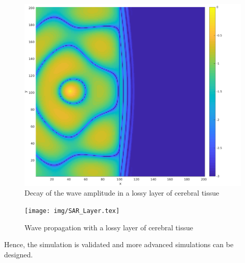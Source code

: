\begin{figure}[H]
\centering
    \includegraphics[width=.8\textwidth]{img/SAR_layer_im.pdf}
     \caption{Decay of the wave amplitude in a lossy layer of cerebral tissue}
     \label{fig:valid:SAR_Layer}
\end{figure}
\begin{figure}[H]
\centering
    \texttt{[image: img/SAR\_Layer.tex]}
     \caption{Wave propagation with a lossy layer of cerebral tissue}
     \label{fig:valid:SAR_Layer_x}
\end{figure}

Hence, the simulation is validated and more advanced simulations can be designed.